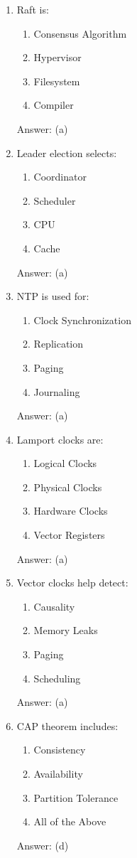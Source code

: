 \begin{enumerate}
\item Raft is:
\begin{enumerate}[label=(\alph*)]
\item Consensus Algorithm
\item Hypervisor
\item Filesystem
\item Compiler
\end{enumerate}
Answer: (a)

\item Leader election selects:
\begin{enumerate}[label=(\alph*)]
\item Coordinator
\item Scheduler
\item CPU
\item Cache
\end{enumerate}
Answer: (a)

\item NTP is used for:
\begin{enumerate}[label=(\alph*)]
\item Clock Synchronization
\item Replication
\item Paging
\item Journaling
\end{enumerate}
Answer: (a)

\item Lamport clocks are:
\begin{enumerate}[label=(\alph*)]
\item Logical Clocks
\item Physical Clocks
\item Hardware Clocks
\item Vector Registers
\end{enumerate}
Answer: (a)

\item Vector clocks help detect:
\begin{enumerate}[label=(\alph*)]
\item Causality
\item Memory Leaks
\item Paging
\item Scheduling
\end{enumerate}
Answer: (a)

\item CAP theorem includes:
\begin{enumerate}[label=(\alph*)]
\item Consistency
\item Availability
\item Partition Tolerance
\item All of the Above
\end{enumerate}
Answer: (d)


\end{enumerate}
